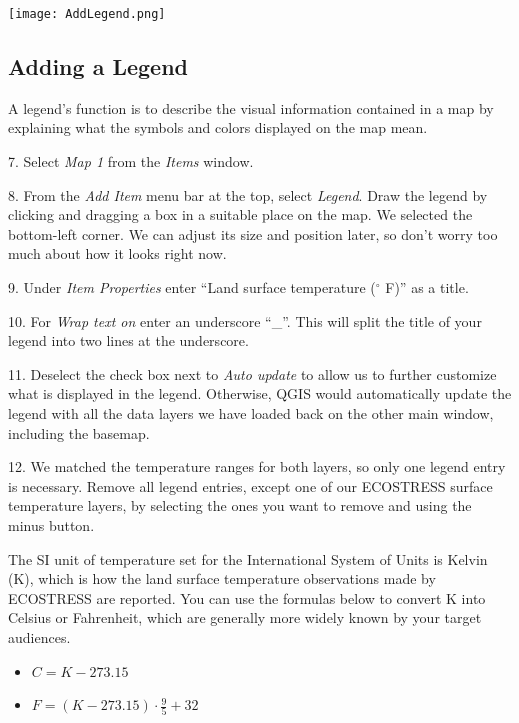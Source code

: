 \documentclass[oneside,a4paper,11pt,explicit]{book}
\begin{document}
\centerline{\texttt{[image: AddLegend.png]}}

\subsection{Adding a Legend}

A legend's function is to describe the visual information contained in a map by explaining what the symbols and colors displayed on the map mean.

\vspace{.5em}

7. Select \textit{Map 1} from the \textit{Items} window.

8. From the \textit{Add Item} menu bar at the top, select \textit{Legend}. Draw the legend by clicking and dragging a box in a suitable place on the map. We selected the bottom-left corner. We can adjust its size and position later, so don't worry too much about how it looks right now.

9. Under \textit{Item Properties} enter ``Land surface temperature ($^{\circ}$ F)'' as a title.

10. For \textit{Wrap text on} enter an underscore ``\_''. This will split the title of your legend into two lines at the underscore. 

11. Deselect the check box next to \textit{Auto update} to allow us to further customize what is displayed in the legend. Otherwise, QGIS would automatically update the legend with all the data layers we have loaded back on the other main window, including the basemap.

12. We matched the temperature ranges for both layers, so only one legend entry is necessary. Remove all legend entries, except one of our ECOSTRESS surface temperature layers, by selecting the ones you want to remove and using the minus button. 

\vspace{.5em}

The SI unit of temperature set for the International System of Units is Kelvin (K), which is how the land surface temperature observations made by ECOSTRESS are reported. You can use the formulas below to convert K into Celsius or Fahrenheit, which are generally more widely known by your target audiences. 
\begin{itemize}
	\item $C = K - 273.15$
	\item $F = (K - 273.15) \cdot \frac{9}{5} + 32$
\end{itemize}
\end{document}
